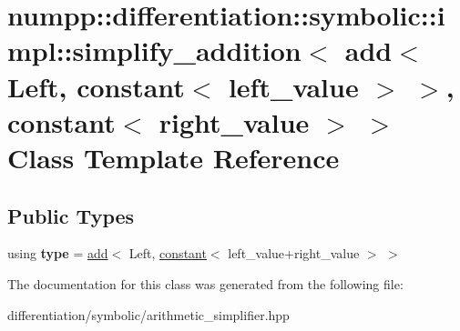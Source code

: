 \hypertarget{classnumpp_1_1differentiation_1_1symbolic_1_1impl_1_1simplify__addition_3_01add_3_01Left_00_01co9800d9c084c22272aa6400ee9a366a08}{}\section{numpp\+:\+:differentiation\+:\+:symbolic\+:\+:impl\+:\+:simplify\+\_\+addition$<$ add$<$ Left, constant$<$ left\+\_\+value $>$ $>$, constant$<$ right\+\_\+value $>$ $>$ Class Template Reference}
\label{classnumpp_1_1differentiation_1_1symbolic_1_1impl_1_1simplify__addition_3_01add_3_01Left_00_01co9800d9c084c22272aa6400ee9a366a08}
\subsection*{Public Types}
\begin{DoxyCompactItemize}
\item 
\mbox{\label{classnumpp_1_1differentiation_1_1symbolic_1_1impl_1_1simplify__addition_3_01add_3_01Left_00_01co9800d9c084c22272aa6400ee9a366a08_a0c2214a7dcb144ce2930a2476707a7a4}} 
using {\bfseries type} = \hyperlink{classnumpp_1_1differentiation_1_1symbolic_1_1add}{add}$<$ Left, \hyperlink{classnumpp_1_1differentiation_1_1symbolic_1_1constant}{constant}$<$ left\+\_\+value+right\+\_\+value $>$ $>$
\end{DoxyCompactItemize}


The documentation for this class was generated from the following file\+:\begin{DoxyCompactItemize}
\item 
differentiation/symbolic/arithmetic\+\_\+simplifier.\+hpp\end{DoxyCompactItemize}
